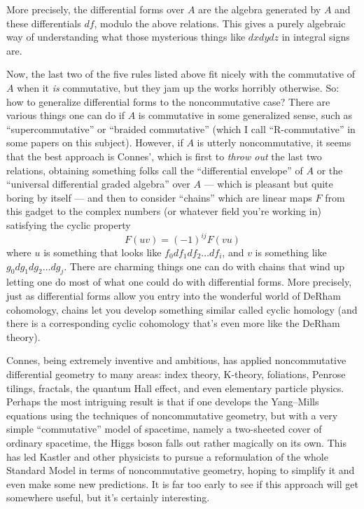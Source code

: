 \documentclass[12pt]{article}
\begin{document}
More precisely, the differential forms over \(A\) are the algebra
generated by \(A\) and these differentials \(df\), modulo the above
relations. This gives a purely algebraic way of understanding what those
mysterious things like \(dx dy dz\) in integral signs are.

Now, the last two of the five rules listed above fit nicely with the
commutative of \(A\) when it \emph{is} commutative, but they jam up the
works horribly otherwise. So: how to generalize differential forms to
the noncommutative case? There are various things one can do if \(A\) is
commutative in some generalized sense, such as ``supercommutative'' or
``braided commutative'' (which I call ``R-commutative'' in some papers
on this subject). However, if \(A\) is utterly noncommutative, it seems
that the best approach is Connes', which is first to \emph{throw out}
the last two relations, obtaining something folks call the
``differential envelope'' of \(A\) or the ``universal differential
graded algebra'' over \(A\) --- which is pleasant but quite boring by
itself --- and then to consider ``chains'' which are linear maps \(F\)
from this gadget to the complex numbers (or whatever field you're
working in) satisfying the cyclic property \[F(uv) = (-1)^{ij} F(vu)\]
where \(u\) is something that looks like \(f_0 df_1 df_2 \ldots df_i\),
and \(v\) is something like \(g_0 dg_1 dg_2 \ldots dg_j\). There are
charming things one can do with chains that wind up letting one do most
of what one could do with differential forms. More precisely, just as
differential forms allow you entry into the wonderful world of DeRham
cohomology, chains let you develop something similar called cyclic
homology (and there is a corresponding cyclic cohomology that's even
more like the DeRham theory).

Connes, being extremely inventive and ambitious, has applied
noncommutative differential geometry to many areas: index theory,
K-theory, foliations, Penrose tilings, fractals, the quantum Hall
effect, and even elementary particle physics. Perhaps the most
intriguing result is that if one develops the Yang--Mills equations using
the techniques of noncommutative geometry, but with a very simple
``commutative'' model of spacetime, namely a two-sheeted cover of
ordinary spacetime, the Higgs boson falls out rather magically on its
own. This has led Kastler and other physicists to pursue a reformulation
of the whole Standard Model in terms of noncommutative geometry, hoping
to simplify it and even make some new predictions. It is far too early
to see if this approach will get somewhere useful, but it's certainly
interesting.
\end{document}
